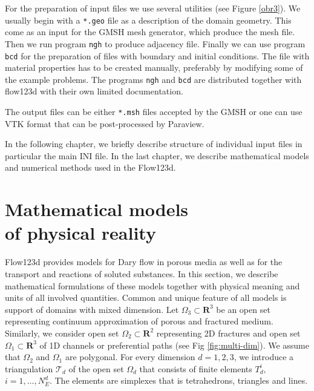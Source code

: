 \documentclass[12pt,a4paper]{report}
\def\Real{{\mathbf R}}
\begin{document}
For the preparation of input files we use several utilities (see Figure \ref{obr3}). 
We usually begin with a \verb'*.geo' file as a description of the domain geometry. This come as an input for the GMSH mesh generator, which produce 
the mesh file. Then we run program \verb'ngh' to produce adjacency file. Finally we can use program \verb'bcd' for the preparation of files with
boundary and initial conditions. The file with material properties has to be created manually, preferably by modifying some of the example problems.
The programs \verb'ngh' and \verb'bcd' are distributed together with flow123d with their own limited documentation.

The output files can be either \verb'*.msh' files accepted by the GMSH or one can use VTK format that can be post-processed by Paraview.

In the following chapter, we briefly describe structure of individual input files in particular the main INI file. In the last chapter, we describe
mathematical models and numerical methods used in the Flow123d.


\chapter{Mathematical models \\of physical reality}

Flow123d provides models for Dary flow in porous media as well as for the transport and reactions of soluted substances. In this section, we describe 
mathematical formulations of these models together with physical meaning and units of all involved quantities. Common and unique feature of all models is support of
domains with mixed dimension. Let $\Omega_{3} \subset \Real^3$ be an open set representing continuum approximation of porous and fractured medium.
Similarly, we consider open set $\Omega_2\subset \Real^2$ representing 2D fractures and open set $\Omega_1\subset \Real^3$ of 1D channels or preferential paths 
(see Fig \ref{fig:multi-dim}).
We assume that $\Omega_2$ and $\Omega_1$ are polygonal. For every dimension $d=1,2,3$, we introduce a triangulation $\mathcal{T}_{d}$ of the open set $\Omega_d$
that consists of finite elements $T_{d}^{i},$\ $i = 1,\dots,N_{E}^{d}$. The elements are simplexes that is tetrahedrons, triangles and lines.
\end{document}
